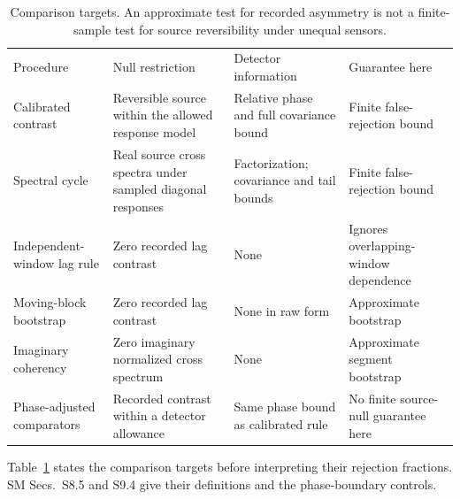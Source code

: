 \begin{table}[t]
\caption{Comparison targets. An approximate test for recorded asymmetry is not a finite-sample test for source reversibility under unequal sensors.}\label{tab:comparators}
\begin{ruledtabular}\begin{tabular}{>{\raggedright\arraybackslash}p{}>{\raggedright\arraybackslash}p{}>{\raggedright\arraybackslash}p{}>{\raggedright\arraybackslash}p{}}
Procedure & Null restriction & Detector information & Guarantee here\\
Calibrated contrast & Reversible source within the allowed response model & Relative phase and full covariance bound & Finite false-rejection bound\\
Spectral cycle & Real source cross spectra under sampled diagonal responses & Factorization; covariance and tail bounds & Finite false-rejection bound\\
Independent-window lag rule & Zero recorded lag contrast & None & Ignores overlapping-window dependence\\
Moving-block bootstrap & Zero recorded lag contrast & None in raw form & Approximate bootstrap\\
Imaginary coherency & Zero imaginary normalized cross spectrum & None & Approximate segment bootstrap\\
Phase-adjusted comparators & Recorded contrast within a detector allowance & Same phase bound as calibrated rule & No finite source-null guarantee here\\
\end{tabular}\end{ruledtabular}
\end{table}
Table~\ref{tab:comparators} states the comparison targets before interpreting their rejection fractions. SM Secs.~S8.5 and S9.4 give their definitions and the phase-boundary controls.
